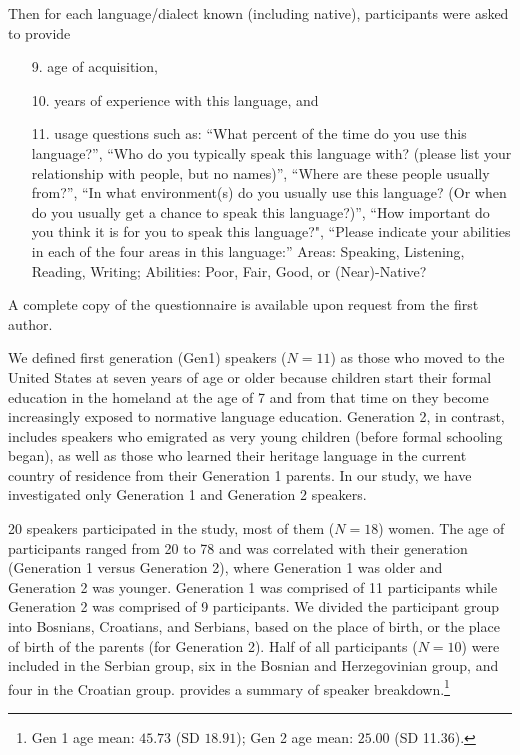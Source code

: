 \documentclass[output=paper,
modfonts,
newtxmath,
hidelinks,
]{langscibook}
\begin{document}
Then for each language/dialect known (including native), participants were asked to provide 

\begin{enumerate}
\item[9.] age of acquisition, 
\item[10.] years of experience with this language, and 
\item[11.] usage questions such as:          
  “What percent of the time do you use this language?”,    
  “Who do you typically speak this language with? (please list your     relationship with people, but no names)”, “Where are these people usually from?”,
  “In what environment(s) do you usually use this language? (Or when do     you usually get a chance to speak this language?)”,
  “How important do you think it is for you to speak this language?", 
  “Please indicate your abilities in each of the four areas in this language:” Areas: Speaking, Listening, Reading, Writing; Abilities: Poor, Fair, Good, or (Near)-Native?
\end{enumerate}

A complete copy of the questionnaire is available upon request from the first author.

We defined first generation (Gen1) speakers ($N=11$) as those who moved to the United States at seven years of age or older because children start their formal education in the homeland at the age of 7 and from that time on they become increasingly exposed to normative language education. Generation 2, in contrast, includes speakers who emigrated as very young children (before formal schooling began), as well as those who learned their heritage language in the current country of residence from their Generation 1 parents. In our study, we have investigated only Generation 1 and Generation 2 speakers.



20 speakers participated in the study, most of them ($N=18$) women. The age of participants ranged from 20 to 78 and was correlated with their generation (Generation 1 versus Generation 2), where Generation 1 was older and Generation 2 was younger. Generation 1 was comprised of 11 participants while Generation 2 was comprised of 9 participants. We divided the participant group into Bosnians, Croatians, and Serbians, based on the place of birth, or the place of birth of the parents (for Generation 2). Half of all participants ($N=10$) were included in the Serbian group, six in the Bosnian and Herzegovinian group, and four in the Croatian group.  provides a summary of speaker breakdown.\footnote{Gen 1 age mean: $45.73$ (SD $18.91$); Gen 2 age mean: $25.00$ (SD 11.36).}
\end{document}
